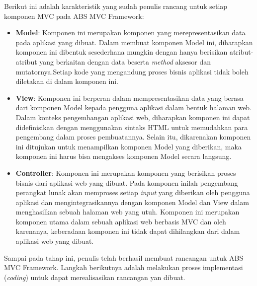 Berikut ini adalah karakteristik yang sudah penulis rancang untuk setiap komponen MVC pada ABS MVC Framework:

\begin{itemize}
    \item \textbf{Model}: Komponen ini merupakan komponen yang merepresentasikan data pada aplikasi yang dibuat. Dalam membuat komponen Model ini, diharapkan komponen ini dibentuk sesederhana mungkin dengan hanya berisikan atribut-atribut yang berkaitan dengan data beserta \textit{method} aksesor dan mutatornya.Setiap kode yang mengandung proses bisnis aplikasi tidak boleh diletakan di dalam komponen ini.
    \item \textbf{View}: Komponen ini berperan dalam mempresentasikan data yang berasa dari komponen Model kepada pengguna aplikasi dalam bentuk halaman web. Dalam konteks pengembangan aplikasi web, diharapkan komponen ini dapat didefinisikan dengan menggunakan sintaks HTML untuk memudahkan para pengembang dalam proses pembuatannya. Selain itu, dikarenakan komponen ini ditujukan untuk menampilkan komponen Model yang diberikan, maka komponen ini harus bisa mengakses komponen Model secara langsung.
    \item \textbf{Controller}: Komponen ini merupakan komponen yang berisikan proses bisnis dari aplikasi web yang dibuat. Pada komponen inilah pengembang perangkat lunak akan memproses setiap \textit{input} yang diberikan oleh pengguna aplikasi dan mengintegrasikannya dengan komponen Model dan View dalam menghasilkan sebuah halaman web yang utuh. Komponen ini merupakan komponen utama dalam sebuah aplikasi web berbasis MVC dan oleh karenanya, keberadaan komponen ini tidak dapat dihilangkan dari dalam aplikasi web yang dibuat.
\end{itemize}

Sampai pada tahap ini, penulis telah berhasil membuat rancangan untuk ABS MVC Framework. Langkah berikutnya adalah melakukan proses implementasi (\textit{coding}) untuk dapat merealisasikan rancangan yan dibuat.
